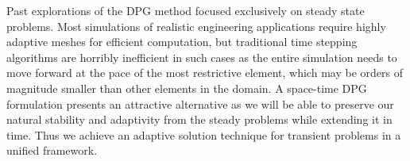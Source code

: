 \documentclass[letterpaper,12pt]{article}
\begin{document}
Past explorations of the DPG method focused exclusively on steady state problems.
Most simulations of realistic engineering applications require highly adaptive meshes for efficient computation,
but traditional time stepping algorithms are horribly inefficient in such cases as the entire simulation needs to move forward 
at the pace of the most restrictive element, which may be orders of magnitude smaller than other elements in the domain.
A space-time DPG formulation presents an attractive alternative as we will be able to preserve our natural stability and adaptivity 
from the steady problems while extending it in time.
Thus we achieve an adaptive solution technique for transient problems in a unified framework.
\end{document}
